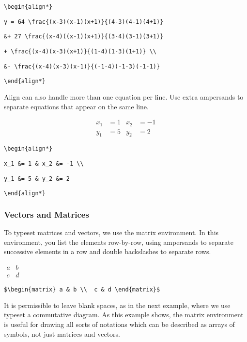\verb"\begin{align*}"

\verb"y = 64 \frac{(x-3)(x-1)(x+1)}{(4-3)(4-1)(4+1)} "

\verb"&+ 27 \frac{(x-4)((x-1)(x+1)}{(3-4)(3-1)(3+1)}"

\verb"+ \frac{(x-4)(x-3)(x+1)}{(1-4)(1-3)(1+1)} \\"

\verb"&- \frac{(x-4)(x-3)(x-1)}{(-1-4)(-1-3)(-1-1)}"

\verb"\end{align*}"

\bigskip

Align can also handle more than one equation per line.  Use extra ampersands to separate equations that appear on the same line.

\begin{align*}
x_1 &= 1 & x_2 &= -1 \\
y_1 &= 5 & y_2 &= 2
\end{align*} 

\verb"\begin{align*}"

\verb"x_1 &= 1 & x_2 &= -1 \\"

\verb"y_1 &= 5 & y_2 &= 2"

\verb"\end{align*} "

\subsubsection{Vectors and Matrices}

To typeset matrices and vectors, we use the matrix environment.  In this environment, you list the elements row-by-row, using ampersands to separate successive elements in a row and double backslashes to separate rows.

\medskip

$\begin{matrix} a & b \\  c & d \end{matrix}$

\smallskip

\verb'$\begin{matrix} a & b \\  c & d \end{matrix}$'

\bigskip

It is permissible to leave blank spaces, as in the next example, where we use typeset a commutative diagram.  As this example shows, the matrix environment is useful for drawing all sorts of notations which can be described as arrays of symbols, not just matrices and vectors.


